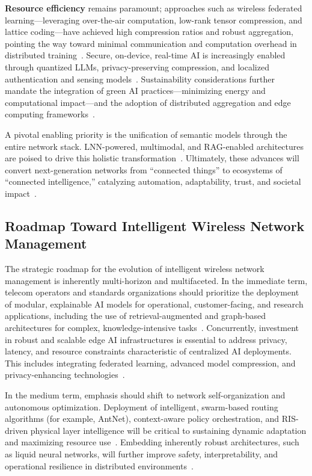 \textbf{Resource efficiency} remains paramount; approaches such as wireless federated learning---leveraging over-the-air computation, low-rank tensor compression, and lattice coding---have achieved high compression ratios and robust aggregation, pointing the way toward minimal communication and computation overhead in distributed training~\cite{ref17}. Secure, on-device, real-time AI is increasingly enabled through quantized LLMs, privacy-preserving compression, and localized authentication and sensing models~\cite{ref18,ref19,ref20,ref24}. Sustainability considerations further mandate the integration of green AI practices---minimizing energy and computational impact---and the adoption of distributed aggregation and edge computing frameworks~\cite{ref16,ref19,ref20,ref24,ref25}.

A pivotal enabling priority is the unification of semantic models through the entire network stack. LNN-powered, multimodal, and RAG-enabled architectures are poised to drive this holistic transformation~\cite{ref7,ref16,ref17,ref18,ref19,ref20,ref21,ref22,ref23,ref24,ref25,ref26,ref30,ref35,ref46,ref49}. Ultimately, these advances will convert next-generation networks from ``connected things'' to ecosystems of ``connected intelligence,'' catalyzing automation, adaptability, trust, and societal impact~\cite{ref16,ref20,ref24,ref49}.

\subsection{Roadmap Toward Intelligent Wireless Network Management}

The strategic roadmap for the evolution of intelligent wireless network management is inherently multi-horizon and multifaceted. In the immediate term, telecom operators and standards organizations should prioritize the deployment of modular, explainable AI models for operational, customer-facing, and research applications, including the use of retrieval-augmented and graph-based architectures for complex, knowledge-intensive tasks~\cite{ref7, ref16, ref30}. Concurrently, investment in robust and scalable edge AI infrastructures is essential to address privacy, latency, and resource constraints characteristic of centralized AI deployments. This includes integrating federated learning, advanced model compression, and privacy-enhancing technologies~\cite{ref17, ref19, ref20, ref24, ref25, ref49}.

In the medium term, emphasis should shift to network self-organization and autonomous optimization. Deployment of intelligent, swarm-based routing algorithms (for example, AntNet), context-aware policy orchestration, and RIS-driven physical layer intelligence will be critical to sustaining dynamic adaptation and maximizing resource use~\cite{ref15, ref21, ref22, ref26, ref27, ref28, ref46}. Embedding inherently robust architectures, such as liquid neural networks, will further improve safety, interpretability, and operational resilience in distributed environments~\cite{ref19, ref30, ref35}.

